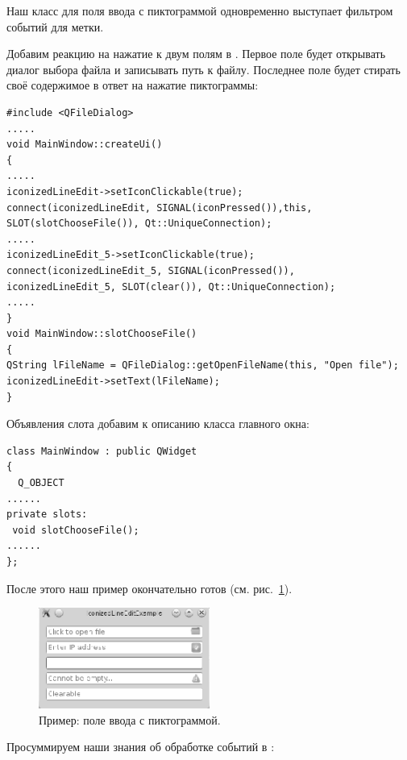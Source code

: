 Наш класс для поля ввода с пиктограммой одновременно выступает фильтром событий для метки.

Добавим реакцию на нажатие к двум полям в . 
Первое поле будет открывать диалог выбора
файла и записывать путь к файлу. Последнее поле будет стирать своё 
содержимое в ответ на нажатие пиктограммы:
\begin{lstlisting}
#include <QFileDialog>
.....
void MainWindow::createUi()
{
.....
iconizedLineEdit->setIconClickable(true);
connect(iconizedLineEdit, SIGNAL(iconPressed()),this, SLOT(slotChooseFile()), Qt::UniqueConnection);
.....
iconizedLineEdit_5->setIconClickable(true);
connect(iconizedLineEdit_5, SIGNAL(iconPressed()),
iconizedLineEdit_5, SLOT(clear()), Qt::UniqueConnection);
.....
}
void MainWindow::slotChooseFile()
{
QString lFileName = QFileDialog::getOpenFileName(this, "Open file");
iconizedLineEdit->setText(lFileName);
}
\end{lstlisting}

Объявления слота  добавим к описанию класса главного окна:
\begin{lstlisting}
class MainWindow : public QWidget
{
  Q_OBJECT
......
private slots:
 void slotChooseFile();
......
};
\end{lstlisting}

После этого наш пример окончательно готов (см. рис.~\ref{ch14:refDrawing1}).

\begin{figure}[htb]
\begin{center}
\includegraphics[width=0.5\textwidth]{img/ris_14_2}
\caption[Пример: поле ввода с пиктограммой.]{Пример: поле ввода с пиктограммой.}
\label{ch14:refDrawing1}
\end{center}
\end{figure}

Просуммируем наши знания об обработке событий в :

